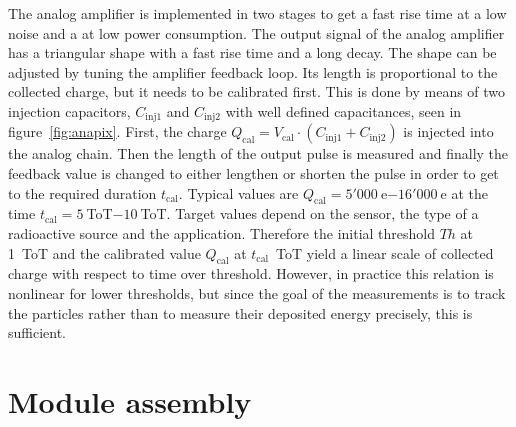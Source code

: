 The analog amplifier is implemented in two stages to get a fast rise time at a low noise and a at low power consumption. The output signal of the analog amplifier has a triangular shape with a fast rise time and a long decay.  The shape can be adjusted by tuning the amplifier feedback loop. Its length is proportional to the collected charge, but it needs to be calibrated first. This is done by means of two injection capacitors, $C_\mathrm{inj1}$ and $C_\mathrm{inj2}$ with well defined capacitances, seen in figure~\ref{fig:anapix}. First, the charge $Q_\mathrm{cal}=V_\mathrm{cal}\cdot(C_\mathrm{inj1}+C_\mathrm{inj2})$ is injected into the analog chain. Then the length of the output pulse is measured and finally the feedback value is changed to either lengthen or shorten the pulse in order to get to the required duration $t_\mathrm{cal}$. Typical values are $Q_\mathrm{cal}=5'000~$e$-16'000~$e at the time $t_\mathrm{cal}=5~$ToT$-10~$ToT. Target values depend on the sensor, the type of a radioactive source and the application. Therefore the initial threshold $Th$ at 1~ToT and the calibrated value $Q_\mathrm{cal}$ at $t_\mathrm{cal}$~ToT yield a linear scale of collected charge with respect to time over threshold.
However, in practice this relation is nonlinear for lower thresholds, but since the goal of the measurements is to track the particles rather than to measure their deposited energy precisely, this is sufficient. 


\section{Module assembly}
\label{sec:modass}

